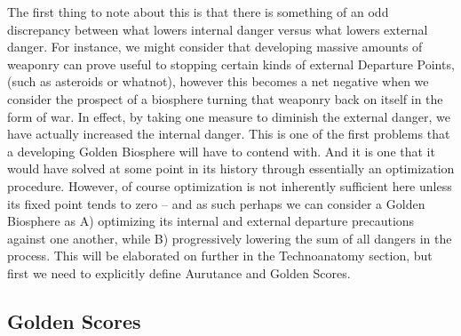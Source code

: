 The first thing to note about this is that there is something of an odd discrepancy between what lowers internal danger versus what lowers external danger. For instance, we might consider that developing massive amounts of weaponry can prove useful to stopping certain kinds of external Departure Points, (such as asteroids or whatnot), however this becomes a net negative when we consider the prospect of a biosphere turning that weaponry back on itself in the form of war. In effect, by taking one measure to diminish the external danger, we have actually increased the internal danger. This is one of the first problems that a developing Golden Biosphere will have to contend with. And it is one that it would have solved at some point in its history through essentially an optimization procedure. However, of course optimization is not inherently sufficient here unless its fixed point tends to zero -- and as such perhaps we can consider a Golden Biosphere as A) optimizing its internal and external departure precautions against one another, while B) progressively lowering the sum of all dangers in the process. This will be elaborated on further in the Technoanatomy section, but first we need to explicitly define Aurutance and Golden Scores. 

\subsection{Golden Scores}

